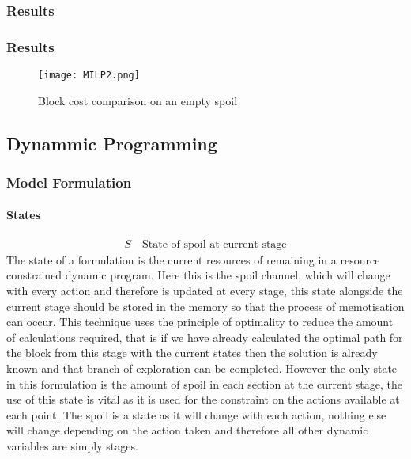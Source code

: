 \subsubsection{Results}
\subsubsection{Results}
\begin{figure}[h]
\caption{Block cost comparison on an empty spoil}
\label{MIP2}
\texttt{[image: MILP2.png]}
\end{figure}

\subsection{Dynammic Programming}
\subsubsection{Model Formulation}
\paragraph*{States}
\begin{align}
\label{Stte}
S \quad \text{State of spoil at current stage}
\end{align}
The state of a formulation is the current resources of remaining in a resource constrained dynamic program. Here this is the spoil channel, which will change with every action and therefore is updated at every stage, this state alongside the current stage should be stored in the memory so that the process of memotisation can occur. This technique uses the principle of optimality to reduce the amount of calculations required, that is if we have already calculated the optimal path for the block from this stage with the current states then the solution is already known and that branch of exploration can be completed. However the only state in this formulation is the amount of spoil in each section at the current stage, the use of this state is vital as it is used for the constraint on the actions available at each point. The spoil is a state as it will change with each action, nothing else will change depending on the action taken and therefore all other dynamic variables are simply stages. 
